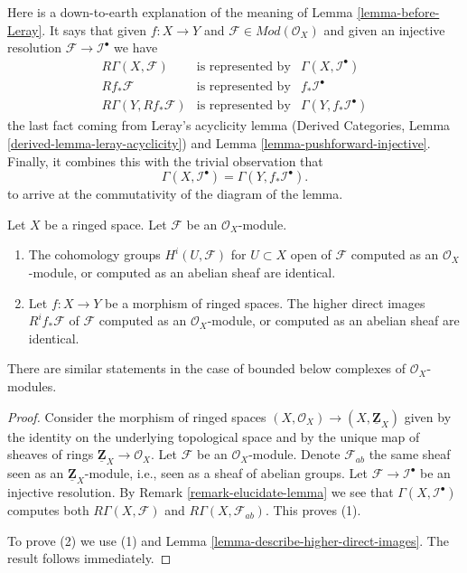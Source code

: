 \begin{remark}
\label{remark-elucidate-lemma}
Here is a down-to-earth explanation of the meaning of
Lemma \ref{lemma-before-Leray}. It says that given
$f : X \to Y$ and $\mathcal{F} \in \textit{Mod}(\mathcal{O}_X)$
and given an injective resolution $\mathcal{F} \to \mathcal{I}^\bullet$
we have
$$
\begin{matrix}
R\Gamma(X, \mathcal{F}) & \text{is represented by} &
\Gamma(X, \mathcal{I}^\bullet) \\
Rf_*\mathcal{F} & \text{is represented by} & f_*\mathcal{I}^\bullet \\
R\Gamma(Y, Rf_*\mathcal{F}) & \text{is represented by} &
\Gamma(Y, f_*\mathcal{I}^\bullet)
\end{matrix}
$$
the last fact coming from Leray's acyclicity lemma
(Derived Categories, Lemma \ref{derived-lemma-leray-acyclicity})
and Lemma \ref{lemma-pushforward-injective}.
Finally, it combines this with the trivial observation that
$$
\Gamma(X, \mathcal{I}^\bullet)
=
\Gamma(Y, f_*\mathcal{I}^\bullet).
$$
to arrive at the commutativity of the diagram of the lemma.
\end{remark}

\begin{lemma}
\label{lemma-modules-abelian}
Let $X$ be a ringed space.
Let $\mathcal{F}$ be an $\mathcal{O}_X$-module.
\begin{enumerate}
\item The cohomology groups $H^i(U, \mathcal{F})$ for $U \subset X$ open
of $\mathcal{F}$ computed as an $\mathcal{O}_X$-module, or computed as an
abelian sheaf are identical.
\item Let $f : X \to Y$ be a morphism of ringed spaces.
The higher direct images $R^if_*\mathcal{F}$ of $\mathcal{F}$
computed as an $\mathcal{O}_X$-module, or computed as an abelian sheaf
are identical.
\end{enumerate}
There are similar statements in the case of bounded below
complexes of $\mathcal{O}_X$-modules.
\end{lemma}

\begin{proof}
Consider the morphism of ringed spaces
$(X, \mathcal{O}_X) \to (X, \underline{\mathbf{Z}}_X)$ given
by the identity on the underlying topological space and by
the unique map of sheaves of rings
$\underline{\mathbf{Z}}_X \to \mathcal{O}_X$.
Let $\mathcal{F}$ be an $\mathcal{O}_X$-module.
Denote $\mathcal{F}_{ab}$ the same sheaf seen as an
$\underline{\mathbf{Z}}_X$-module, i.e., seen as a sheaf of
abelian groups. Let
$\mathcal{F} \to \mathcal{I}^\bullet$ be an injective resolution.
By Remark \ref{remark-elucidate-lemma} we see that
$\Gamma(X, \mathcal{I}^\bullet)$ computes both
$R\Gamma(X, \mathcal{F})$ and $R\Gamma(X, \mathcal{F}_{ab})$.
This proves (1).

\medskip\noindent
To prove (2) we use (1) and Lemma \ref{lemma-describe-higher-direct-images}.
The result follows immediately.
\end{proof}

